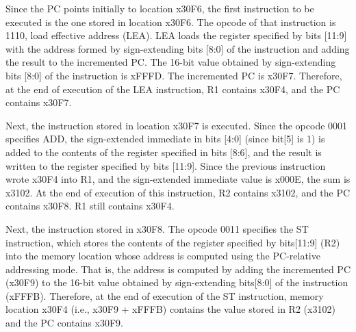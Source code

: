 \documentclass{patt}
\begin{document}

\FloatBarrier

Since the PC points initially to location x30F6, the first instruction
to be executed is the one stored in location x30F6. The opcode
of that instruction is 1110, load effective address (LEA). LEA loads the 
register specified by bits [11:9] with the
address formed by sign-extending bits [8:0] of the instruction and adding
the result to the incremented PC. The 16-bit value obtained by sign-extending
bits [8:0] of the instruction is xFFFD. The incremented PC is x30F7.
Therefore, at the end of execution of the LEA instruction, R1
contains x30F4, and the PC contains x30F7.

Next, the instruction stored in location x30F7 is executed. Since the opcode 
0001 specifies ADD, the sign-extended immediate in bits [4:0] (since bit[5] 
is 1) is added to the contents of the register specified in bits [8:6], and 
the result is written to the register specified by bits [11:9]. Since
the previous instruction wrote x30F4 into R1, and the sign-extended
immediate value is x000E, the sum is x3102.  At the end of execution of this 
instruction, R2 contains x3102, and the
PC contains x30F8. R1 still contains x30F4.

Next, the instruction stored in x30F8. The opcode 0011 specifies the ST 
instruction, which stores
the contents of the register specified by bits[11:9] (R2) into the memory 
location whose address is computed using the PC-relative addressing mode. 
That is, the address is computed by adding the incremented PC (x30F9) to 
the 16-bit value obtained by sign-extending bits[8:0] of the
instruction (xFFFB).  Therefore, at the end of execution of the ST 
instruction, memory location x30F4 (i.e., x30F9 + xFFFB) contains the value
stored in R2 (x3102) and the PC contains x30F9.
\end{document}
